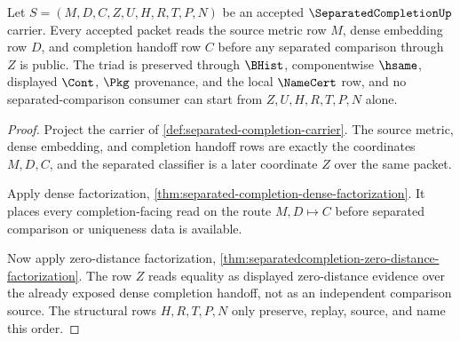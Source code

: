 \begin{theorem}
\label{thm:separatedcompletion-obligation-source-triad}
Let $S=(M,D,C,Z,U,H,R,T,P,N)$ be an accepted $\SeparatedCompletionUp$ carrier. Every accepted packet reads the source metric row $M$, dense embedding row $D$, and completion handoff row $C$ before any separated comparison through $Z$ is public. The triad is preserved through $\BHist$, componentwise $\hsame$, displayed $\Cont$, $\Pkg$ provenance, and the local $\NameCert$ row, and no separated-comparison consumer can start from $Z,U,H,R,T,P,N$ alone.
\end{theorem}
\begin{proof}
Project the carrier of \autoref{def:separated-completion-carrier}. The source metric, dense embedding, and completion handoff rows are exactly the coordinates $M,D,C$, and the separated classifier is a later coordinate $Z$ over the same packet.

Apply dense factorization, \autoref{thm:separated-completion-dense-factorization}. It places every completion-facing read on the route $M,D\mapsto C$ before separated comparison or uniqueness data is available.

Now apply zero-distance factorization, \autoref{thm:separatedcompletion-zero-distance-factorization}. The row $Z$ reads equality as displayed zero-distance evidence over the already exposed dense completion handoff, not as an independent comparison source. The structural rows $H,R,T,P,N$ only preserve, replay, source, and name this order.
\end{proof}

